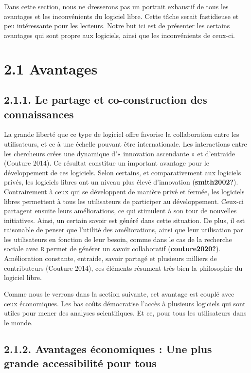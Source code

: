 \documentclass[
  letterpaper,
]{scrbook}
\begin{document}
Dans cette section, nous ne dresserons pas un portrait exhaustif de tous
les avantages et les inconvénients du logiciel libre. Cette tâche serait
fastidieuse et peu intéressante pour les lecteurs. Notre but ici est de
présenter les certains avantages qui sont propre aux logiciels, ainsi
que les inconvénients de ceux-ci.

\hypertarget{avantages}{%
\section{2.1 Avantages}\label{avantages}}

\hypertarget{le-partage-et-co-construction-des-connaissances}{%
\subsection{2.1.1. Le partage et co-construction des
connaissances}\label{le-partage-et-co-construction-des-connaissances}}

La grande liberté que ce type de logiciel offre favorise la
collaboration entre les utilisateurs, et ce à une échelle pouvant être
internationale. Les interactions entre les chercheurs crées une
dynamique d'« innovation ascendante » et d'entraide (Couture 2014). Ce
résultat constitue un important avantage pour le développement de ces
logiciels. Selon certains, et comparativement aux logiciels privés, les
logiciels libres ont un niveau plus élevé d'innovation
(\textbf{smith2002?}). Contrairement à ceux qui se développent de
manière privé et fermée, les logiciels libres permettent à tous les
utilisateurs de participer au développement. Ceux-ci partagent ensuite
leurs améliorations, ce qui stimulent à son tour de nouvelles
initiatives. Ainsi, un certain savoir est généré dans cette situation.
De plus, il est raisonable de penser que l'utilité des améliorations,
ainsi que leur utilisation par les utilisateurs en fonction de leur
besoin, comme dans le cas de la recherche sociale avec \texttt{R} permet
de générer un savoir collaboratif (\textbf{couture2020?}). Amélioration
constante, entraide, savoir partagé et plusieurs milliers de
contributeurs (Couture 2014), ces éléments résument très bien la
philosophie du logiciel libre.

Comme nous le verrons dans la section suivante, cet avantage est couplé
avec ceux économiques. Les bas coûts démocratise l'accès à plusieurs
logiciels qui sont utiles pour mener des analyses scientifiques. Et ce,
pour tous les utilisateurs dans le monde.

\hypertarget{avantages-uxe9conomiques-une-plus-grande-accessibilituxe9-pour-tous}{%
\subsection{2.1.2. Avantages économiques : Une plus grande accessibilité
pour
tous}\label{avantages-uxe9conomiques-une-plus-grande-accessibilituxe9-pour-tous}}
\end{document}
